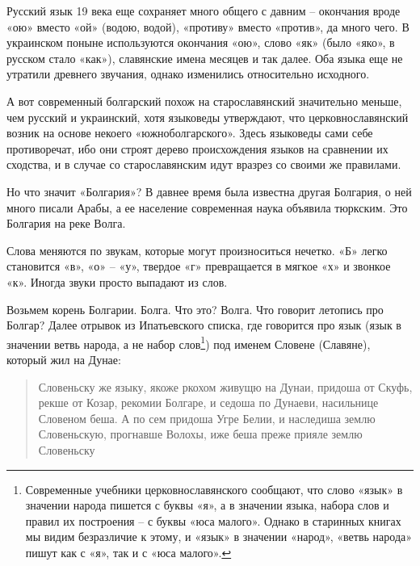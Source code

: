 Русский язык 19 века еще сохраняет много общего с давним – окончания вроде «ою» вместо «ой» (водою, водой), «противу» вместо «против», да много чего. В украинском поныне используются окончания «ою», слово «як» (было «яко», в русском стало «как»), славянские имена месяцев и так далее. Оба языка еще не утратили древнего звучания, однако изменились относительно исходного. 

А вот современный болгарский похож на старославянский значительно меньше, чем русский и украинский, хотя языковеды утверждают, что церковнославянский возник на основе некоего «южноболгарского». Здесь языковеды сами себе противоречат, ибо они строят дерево происхождения языков на сравнении их сходства, и в случае со старославянским идут вразрез со своими же правилами. 




Но что значит «Болгария»? В давнее время была известна другая Болгария, о ней много писали Арабы, а ее население современная наука объявила тюркским. Это Болгария на реке Волга.

Слова меняются по звукам, которые могут произноситься нечетко. «Б» легко становится «в», «о» – «у», твердое «г» превращается в мягкое «х» и звонкое «к». Иногда звуки просто выпадают из слов.

Возьмем корень Болгарии. Болга. Что это? Волга. Что говорит летопись про Болгар? Далее отрывок из Ипатьевского списка, где говорится про язык (язык в значении ветвь народа, а не набор слов\footnote{Современные учебники церковнославянского сообщают, что слово «язык» в значении народа пишется с буквы «я», а в значении языка, набора слов и правил их построения – с буквы «юса малого». Однако в старинных книгах мы видим безразличие к этому, и «язык» в значении «народ», «ветвь народа» пишут как с «я», так и с «юса малого».}) под именем Словене (Славяне), который жил на Дунае:

\begin{quotation} 
Словеньску же языку, якоже ркохом живущю на Дунаи, придоша от Скуфь, рекше от Козар, рекомии Болгаре, и седоша по Дунаеви, насильнице Словеном беша. А по сем придоша Угре Белии, и наследиша землю Словеньскую, прогнавше Волохы, иже беша преже прияле землю Словеньску
\end{quotation} 

